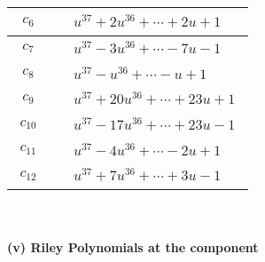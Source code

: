 \documentclass[1p]{elsarticle_modified}
\theoremstyle{definition}
\begin{document}
\begin{tabular}{m{50pt}|m{274pt}}
\hline $$\begin{aligned}c_{6}\end{aligned}$$&$\begin{aligned}
&u^{37}+2 u^{36}+\cdots+2 u+1
\end{aligned}$\\
\hline $$\begin{aligned}c_{7}\end{aligned}$$&$\begin{aligned}
&u^{37}-3 u^{36}+\cdots-7 u-1
\end{aligned}$\\
\hline $$\begin{aligned}c_{8}\end{aligned}$$&$\begin{aligned}
&u^{37}- u^{36}+\cdots- u+1
\end{aligned}$\\
\hline $$\begin{aligned}c_{9}\end{aligned}$$&$\begin{aligned}
&u^{37}+20 u^{36}+\cdots+23 u+1
\end{aligned}$\\
\hline $$\begin{aligned}c_{10}\end{aligned}$$&$\begin{aligned}
&u^{37}-17 u^{36}+\cdots+23 u-1
\end{aligned}$\\
\hline $$\begin{aligned}c_{11}\end{aligned}$$&$\begin{aligned}
&u^{37}-4 u^{36}+\cdots-2 u+1
\end{aligned}$\\
\hline $$\begin{aligned}c_{12}\end{aligned}$$&$\begin{aligned}
&u^{37}+7 u^{36}+\cdots+3 u-1
\end{aligned}$\\
\hline
\end{tabular}\\~\\
\newpage\renewcommand{\arraystretch}{1}
\flushleft \textbf{(v) Riley Polynomials at the component}\newline \\
\end{document}
